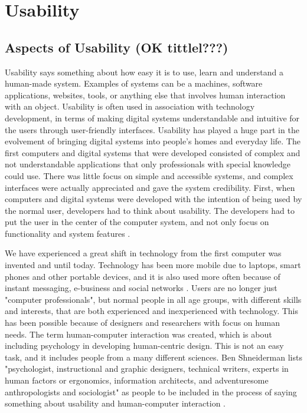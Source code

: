 \chapter{Usability}

\section{Aspects of Usability (OK tittlel???)}
Usability says something about how easy it is to use, learn and understand a human-made system. Examples of systems can be a machines, software applications, websites, tools, or anything else that involves human interaction with an object. Usability is often used in association with technology development, in terms of making digital systems understandable and intuitive for the users through user-friendly interfaces. Usability has played a huge part in the evolvement of bringing digital systems into people's homes and everyday life. The first computers and digital systems that were developed consisted of complex and not understandable applications that only professionals with special knowledge could use. There was little focus on simple and accessible systems, and complex interfaces were actually appreciated and gave the system credibility. First, when computers and digital systems were developed with the intention of being used by the normal user, developers had to think about usability. The developers had to put the user in the center of the computer system, and not only focus on functionality and system features \cite{mmi}.

We have experienced a great shift in technology from the first computer was invented and until today. Technology has been more mobile due to laptops, smart phones and other portable devices, and it is also used more often because of instant messaging, e-business and social networks \cite{mmi}. Users are no longer just "computer professionals", but normal people in all age groups, with different skills and interests, that are both experienced and inexperienced with technology. This has been possible because of designers and researchers with focus on human needs. The term human-computer interaction was created, which is about including psychology in developing human-centric design. This is not an easy task, and it includes people from a many different sciences. Ben Shneiderman lists "psychologist, instructional and graphic designers, technical writers, experts in human factors or ergonomics, information architects, and adventuresome anthropologists and sociologist" as people to be included in the process of saying something about usability and human-computer interaction \cite{mmi}.  

